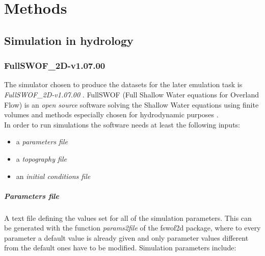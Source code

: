 \chapter{Methods}
\label{chp:methods}

\section{Simulation in hydrology}

\subsection{FullSWOF\_2D-v1.07.00}

The simulator chosen to produce the datasets for the later emulation task is \textit{FullSWOF\_2D-v1.07.00} \autocite{delestre_fullswof:_2017}. FullSWOF (Full Shallow Water equations for Overland Flow) is an \emph{open source} software solving the Shallow Water equations using finite volumes and methods especially chosen for hydrodynamic purposes \autocite{the_fullswof_team_fullswof_2018}.\\

In order to run simulations the software needs at least the following inputs:

\begin{itemize}
\itemsep0em
  \item a \emph{parameters file}
  \item a \emph{topography file}
  \item an \emph{initial conditions file}
\end{itemize}

\paragraph{Parameters file} A text file defining the values set for all of the simulation parameters. This can be generated with the function \textit{params2file} of the fswof2d package, where to every parameter a default value is already given and only parameter values different from the default ones have to be modified. Simulation parameters include:

